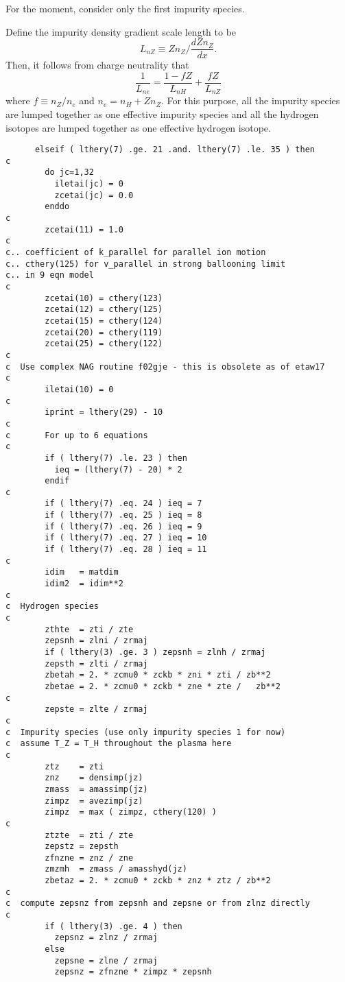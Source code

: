 For the moment, consider only the first impurity species.

Define the impurity density gradient scale length to be
\[ L_{nZ} \equiv Z n_Z / \frac{d Z n_Z}{d x}. \]
Then, it follows from charge neutrality that
\[ \frac{1}{L_{ne}} = \frac{ 1 - f Z }{L_{nH}} + \frac{ f Z }{L_{nZ}} \]
where $ f \equiv n_Z / n_e $ and $ n_e = n_H + Z n_Z $.
For this purpose, all the impurity species are lumped together as 
one effective impurity species and all the hydrogen isotopes are lumped 
together as one effective hydrogen isotope.

\begin{verbatim}
      elseif ( lthery(7) .ge. 21 .and. lthery(7) .le. 35 ) then
c
        do jc=1,32
          iletai(jc) = 0
          zcetai(jc) = 0.0
        enddo
c
        zcetai(11) = 1.0
c
c.. coefficient of k_parallel for parallel ion motion
c.. cthery(125) for v_parallel in strong ballooning limit
c.. in 9 eqn model
c
        zcetai(10) = cthery(123)
        zcetai(12) = cthery(125)
        zcetai(15) = cthery(124)
        zcetai(20) = cthery(119)
        zcetai(25) = cthery(122)
c
c  Use complex NAG routine f02gje - this is obsolete as of etaw17 
c
        iletai(10) = 0
c
        iprint = lthery(29) - 10
c
c       For up to 6 equations
c
        if ( lthery(7) .le. 23 ) then
          ieq = (lthery(7) - 20) * 2
        endif
c
        if ( lthery(7) .eq. 24 ) ieq = 7
        if ( lthery(7) .eq. 25 ) ieq = 8
        if ( lthery(7) .eq. 26 ) ieq = 9
        if ( lthery(7) .eq. 27 ) ieq = 10
        if ( lthery(7) .eq. 28 ) ieq = 11
c
        idim   = matdim
        idim2  = idim**2
c
c  Hydrogen species
c
        zthte  = zti / zte
        zepsnh = zlni / zrmaj
        if ( lthery(3) .ge. 3 ) zepsnh = zlnh / zrmaj
        zepsth = zlti / zrmaj
        zbetah = 2. * zcmu0 * zckb * zni * zti / zb**2
        zbetae = 2. * zcmu0 * zckb * zne * zte /   zb**2
c
        zepste = zlte / zrmaj
c
c  Impurity species (use only impurity species 1 for now)
c  assume T_Z = T_H throughout the plasma here
c
        ztz    = zti
        znz    = densimp(jz)
        zmass  = amassimp(jz)
        zimpz  = avezimp(jz)
        zimpz  = max ( zimpz, cthery(120) )
c
        ztzte  = zti / zte
        zepstz = zepsth
        zfnzne = znz / zne
        zmzmh  = zmass / amasshyd(jz)
        zbetaz = 2. * zcmu0 * zckb * znz * ztz / zb**2
c
c  compute zepsnz from zepsnh and zepsne or from zlnz directly
c
        if ( lthery(3) .ge. 4 ) then
          zepsnz = zlnz / zrmaj
        else
          zepsne = zlne / zrmaj
          zepsnz = zfnzne * zimpz * zepsnh

\end{verbatim}
